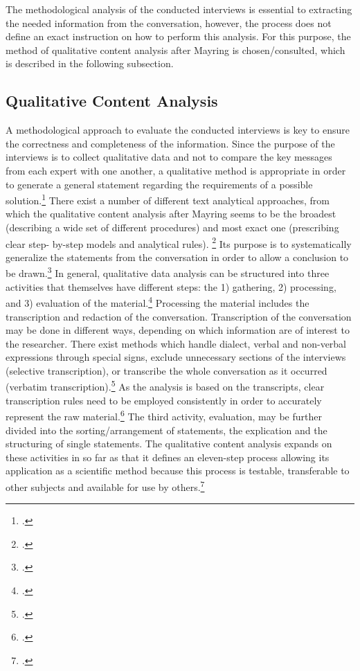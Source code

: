 The methodological analysis of the conducted interviews is essential to extracting the needed information from the conversation, however, the process does not define an exact instruction on how to perform this analysis. For this purpose, the method of qualitative content analysis after Mayring is chosen/consulted, which is described in the following subsection.

\subsection{Qualitative Content Analysis} \label{subsec:Mayring}
A methodological approach to evaluate the conducted interviews is key to ensure the correctness and completeness of the information. Since the purpose of the interviews is to collect qualitative data and not to compare the key messages from each expert with one another, a qualitative method is appropriate in order to generate a general statement regarding the requirements of a possible solution.\footcite[Cf.][p.456]{MeuserExpertInneninterviewsvielfacherprobt1991} There exist a number of different text analytical approaches, from which the qualitative content analysis after Mayring seems to be the broadest (describing a wide set of different procedures) and most exact one (prescribing clear step- by-step models and analytical rules). \footcite[Cf.][p.197]{SteiglederstrukturierendequalitativeInhaltsanalyse2008} Its purpose is to systematically generalize the statements from the conversation in order to allow a conclusion to be drawn.\footcite[Cf.][p.13]{MayringQualitativeContentAnalysis2014}
In general, qualitative data analysis can be structured into three activities that themselves have different steps: the 1) gathering, 2) processing, and 3) evaluation of the material.\footcite[Cf.][p.135 et seqq]{KrugerqualitativeInhaltsanalyseMethode2004} Processing the material includes the transcription and redaction of the conversation. Transcription of the conversation may be done in different ways, depending on which information are of interest to the researcher. There exist methods which handle dialect, verbal and non-verbal expressions through special signs, exclude unnecessary sections of the interviews (selective transcription), or transcribe the whole conversation as it occurred (verbatim transcription).\footcite[Cf.][p.44 et seq]{MayringQualitativeContentAnalysis2014} As the analysis is based on the transcripts, clear transcription rules need to be employed consistently in order to accurately represent the raw material.\footcite[Cf.][p.44]{MayringQualitativeContentAnalysis2014} The third activity, evaluation, may be further divided into the sorting/arrangement of statements, the explication and the structuring of single statements. The qualitative content analysis expands on these activities in so far as that it defines an eleven-step process allowing its application as a scientific method because this process is testable, transferable to other subjects and available for use by others.\footcite[Cf.][p.53]{MayringQualitativeContentAnalysis2014}
 
